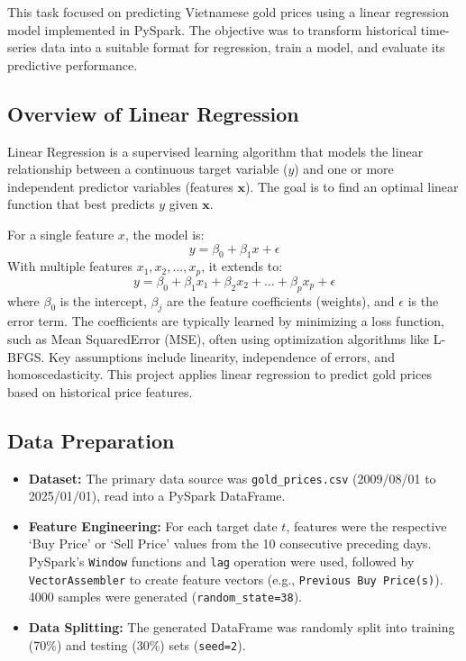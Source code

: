 This task focused on predicting Vietnamese gold prices using a linear regression model implemented in PySpark.
The objective was to transform historical time-series data into a suitable format for regression,
train a model, and evaluate its predictive performance.

\subsection{Overview of Linear Regression}
\label{subsec:overview-of-linear-regression}

Linear Regression is a supervised learning algorithm that models the linear relationship between a continuous target variable ($y$) and one or more independent predictor variables (features $\mathbf{x}$). The goal is to find an optimal linear function that best predicts $y$ given $\mathbf{x}$.

For a single feature $x$, the model is:
\begin{equation}
    y = \beta_0 + \beta_1 x + \epsilon
    \label{eq:simple_lr}
\end{equation}
With multiple features $x_1, x_2, \ldots, x_p$, it extends to:
\begin{equation}
    y = \beta_0 + \beta_1 x_1 + \beta_2 x_2 + \ldots + \beta_p x_p + \epsilon
    \label{eq:multiple_lr}
\end{equation}
where $\beta_0$ is the intercept, $\beta_j$ are the feature coefficients (weights), and $\epsilon$ is the error term.
The coefficients are typically learned by minimizing a loss function, such as Mean SquaredError (MSE), often using optimization algorithms like L-BFGS. Key assumptions include linearity, independence of errors, and homoscedasticity.
This project applies linear regression to predict gold prices based on historical price features.

\subsection{Data Preparation}
\label{subsec:data-preparation}
\begin{itemize}
    \item \textbf{Dataset:} The primary data source was \texttt{gold\_prices.csv} (2009/08/01 to 2025/01/01),
    read into a PySpark DataFrame.
    \item \textbf{Feature Engineering:} For each target date $t$, features were the respective `Buy Price' or `Sell Price' values from the 10 consecutive preceding days.
    PySpark's \texttt{Window} functions and \texttt{lag} operation were used, followed by \texttt{VectorAssembler} to create feature vectors (e.g., \texttt{Previous Buy Price(s)}). 4000 samples were generated (\texttt{random\_state=38}).
    \item \textbf{Data Splitting:} The generated DataFrame was randomly split into training (70\%) and testing (30\%) sets (\texttt{seed=2}).
\end{itemize}

